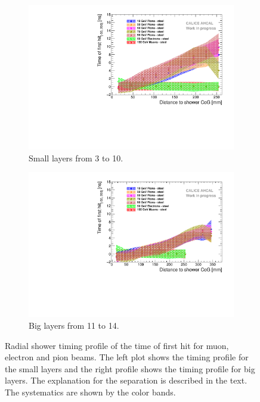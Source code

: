 \begin{figure}[htbp!]
	\begin{subfigure}[t]{0.5\textwidth}
		\centering
		\includegraphics[width=1\textwidth]{../Thesis_Plots/Timing/Pions/Plots/Timing_Radius_Comparison_ShortAsymRange_SSF.pdf}
		\caption{Small layers from 3 to 10.}\label{fig:Radius_Comparison_SSF}
	\end{subfigure}
	\hfill
	\begin{subfigure}[t]{0.5\textwidth}
		\centering
		\includegraphics[width=1\textwidth]{../Thesis_Plots/Timing/Pions/Plots/Timing_Radius_Comparison_ShortAsymRange_BL.pdf}
		\caption{Big layers from 11 to 14.}\label{fig:Radius_Comparison_BL}
	\end{subfigure}
	\caption{Radial shower timing profile of the time of first hit for muon, electron and pion beams. The left plot shows the timing profile for the small layers and the right profile shows the timing profile for big layers. The explanation for the separation is described in the text. The systematics are shown by the color bands.}
	\label{fig:RadialTiming}
\end{figure}

